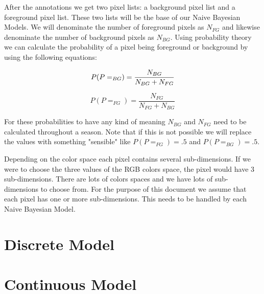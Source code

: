 \documentclass[a4paper,12pt]{report}
\begin{document}
After the annotations we get two pixel lists: a background pixel list and a
foreground pixel list. These two lists will be the base of our Naive Bayesian
Models. We will denominate the number of foreground pixels as $N_{FG}$ and
likewise denominate the number of background pixels as $N_{BG}$. Using probability
theory  we can calculate
the probability of a pixel being foreground or background by using the following
equations:

\begin{equation}
P(P = _{BG}) = \frac{N_{BG}}{N_{BG}+N_{FG}} \\
\end{equation}

\begin{equation}
P(P = _{FG}) = \frac{N_{FG}}{N_{FG}+N_{BG}}
\end{equation}

For these probabilities to have any kind of meaning $N_{BG}$ and $N_{FG}$ need
to be calculated throughout a season. Note that if this is not possible we will
replace the values with something "sensible" like $P(P=_{FG})=.5$ and
$P(P=_{BG})=.5$.

Depending on the color space each pixel contains several sub-dimensions. If we
were to choose the three values of the RGB colors space, the pixel would have 3
sub-dimensions. There are lots of colors spaces and we have lots of
sub-dimensions to choose from. For the purpose of this document we assume that
each pixel has one or more sub-dimensions. This needs to be handled by each
Naive Bayesian Model.

\section{Discrete Model}


\section{Continuous Model}

\listoffixmes
\end{document}
